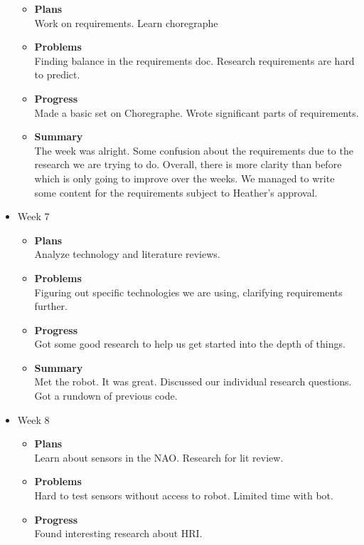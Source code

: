 \begin{itemize}
			\begin{itemize}
				\item \textbf{Plans} \\
				Work on requirements. Learn choregraphe
				\item \textbf{Problems} \\
				Finding balance in the requirements doc. Research requirements are hard to predict.
				\item \textbf{Progress} \\
				Made a basic set on Choregraphe.
				Wrote significant parts of requirements.
				\item \textbf{Summary} \\
				The week was alright. Some confusion about the requirements due to the research we are trying to do. Overall, there is more clarity than before which is only going to improve over the weeks. 
We managed to write some content for the requirements subject to Heather's approval. 
			\end{itemize}
		\item{Week 7}
			\begin{itemize}
				\item \textbf{Plans} \\
				Analyze technology and literature reviews.
				\item \textbf{Problems} \\
				Figuring out specific technologies we are using, clarifying requirements further.
				\item \textbf{Progress} \\
				Got some good research to help us get started into the depth of things.
				\item \textbf{Summary} \\
				Met the robot. It was great. Discussed our individual research questions. Got a rundown of previous code.
			\end{itemize}
		\item{Week 8}
			\begin{itemize}
				\item \textbf{Plans} \\
				Learn about sensors in the NAO. Research for lit review.
				\item \textbf{Problems} \\
				Hard to test sensors without access to robot. Limited time with bot.
				\item \textbf{Progress} \\
				Found interesting research about HRI.

\end{itemize}
\end{itemize}
